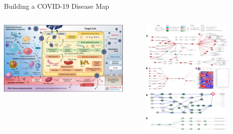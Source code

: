 \documentclass[compress,ignorenonframetext,aspectratio=1610]{beamer}
\begin{document}
\begin{frame}{Building a COVID-19 Disease Map}

	\begin{columns}
		\begin{column}{0.6\textwidth}
			\centering
			\includegraphics[width=0.9\textwidth]{figs/methods/covid19_diseasemap.jpg}

		\end{column}

		\pause

		\begin{column}{0.4\textwidth}
			\centering
			\includegraphics[width=0.8\textwidth]{figs/methods/covipathia.png}

		\end{column}

	\end{columns}
\end{frame}
\end{document}
